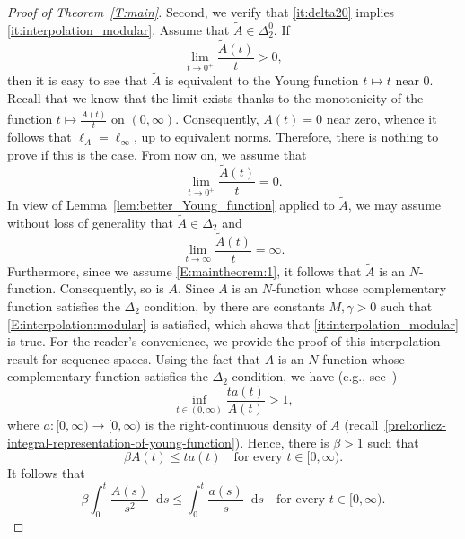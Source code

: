 \documentclass[nointlimits]{amsart}
\numberwithin{equation}{section}
\theoremstyle{plain}
\theoremstyle{definition}
\newcommand{\DTwo}{\Delta_2}
\newcommand{\DTwoZ}{\DTwo^0}
\newcommand{\tA}{\tilde{A}}
\newcommand{\lA}{\ell_A}
\newcommand*\dd{\mathop{}\!\mathrm{d}}
\begin{document}
\begin{proof}[Proof of Theorem~\ref{T:main}]
Second, we verify that \ref{it:delta20} implies \ref{it:interpolation_modular}. Assume that $\tA\in\DTwoZ$. If
\begin{equation*}
    \lim_{t\to 0^+} \frac{\tA(t)}{t} > 0,
\end{equation*}
then it is easy to see that $\tA$ is equivalent to the Young function $t\mapsto t$ near $0$. Recall that we know that the limit exists thanks to the monotonicity of the function $t\mapsto \frac{\tA(t)}{t}$ on $(0,\infty)$. Consequently, $A(t) = 0$ near zero, whence it follows that $\lA = \ell_\infty$, up to equivalent norms. Therefore, there is nothing to prove if this is the case. From now on, we assume that
\begin{equation}\label{E:maintheorem:1}
    \lim_{t\to 0^+} \frac{\tA(t)}{t} = 0.
\end{equation}
In view of Lemma~\ref{lem:better_Young_function} applied to $\tA$, we may assume without loss of generality that $\tA\in\DTwo$ and
\begin{equation*}
    \lim_{t\to\infty} \frac{\tA(t)}{t} = \infty.
\end{equation*}
Furthermore, since we assume \eqref{E:maintheorem:1}, it follows that $\tA$ is an $N$-function. Consequently, so is $A$. Since $A$ is an $N$-function whose complementary function satisfies the $\Delta_2$ condition, by \cite[Theorem~2.2]{Gal:88} there are constants $M,\gamma>0$ such that
\eqref{E:interpolation:modular} is satisfied, which shows that \ref{it:interpolation_modular} is true. For the reader's convenience, we provide the proof of this interpolation result for sequence spaces. Using the fact that $A$ is an $N$-function whose complementary function satisfies the $\Delta_2$ condition, we have (e.g., see~\cite[Proposition~1.4]{Gal:88})
\begin{equation*}
    \inf_{t\in(0,\infty)} \frac{t a(t)}{A(t)} > 1,
\end{equation*}
where $a\colon[0, \infty) \to [0, \infty)$ is the right-continuous density of $A$ (recall~\eqref{prel:orlicz-integral-representation-of-young-function}). Hence, there is $\beta>1$ such that
\begin{equation}\label{E:maintheorem:2}
    \beta A(t) \leq t a(t) \quad \text{for every $t\in[0, \infty)$}.
\end{equation}
It follows that
\begin{equation}\label{E:maintheorem:3}
    \beta \int_0^t \frac{A(s)}{s^2} \dd s \leq \int_0^t \frac{a(s)}{s} \dd s \quad \text{for every $t\in[0, \infty)$}.
\end{equation}

\end{proof}
\end{document}

